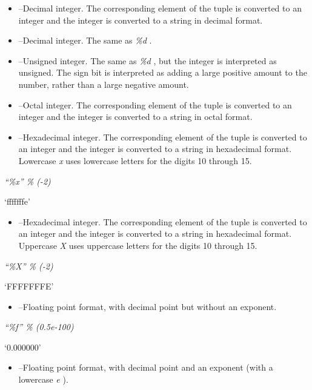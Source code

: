 \begin{itemize}

\item
   --Decimal integer. The
  corresponding element of the tuple is converted to an integer and the
  integer is converted to a string in decimal format.
\item
   --Decimal integer. The
  same as \emph{\%d} .
\item
   --Unsigned integer. The
  same as \emph{\%d} , but the integer is interpreted as unsigned. The
  sign bit is interpreted as adding a large positive amount to the
  number, rather than a large negative amount.
\item
   --Octal integer. The
  corresponding element of the tuple is converted to an integer and the
  integer is converted to a string in octal format.
\item
   --Hexadecimal integer.
  The corresponding element of the tuple is converted to an integer and
  the integer is converted to a string in hexadecimal format. Lowercase
  \emph{x} uses lowercase letters for the digits 10 through 15.
\end{itemize}


\emph{``\%x'' \% (-2)}

`fffffffe'

\begin{itemize}

\item
   --Hexadecimal integer.
  The corresponding element of the tuple is converted to an integer and
  the integer is converted to a string in hexadecimal format. Uppercase
  \emph{X} uses uppercase letters for the digits 10 through 15.
\end{itemize}


\emph{``\%X'' \% (-2)}

`FFFFFFFE'

\begin{itemize}

\item
   --Floating point
  format, with decimal point but without an exponent.
\end{itemize}


\emph{``\%f'' \% (0.5e-100)}

`0.000000'

\begin{itemize}

\item
   --Floating point
  format, with decimal point and an exponent (with a lowercase \emph{e}
  ).
\end{itemize}


